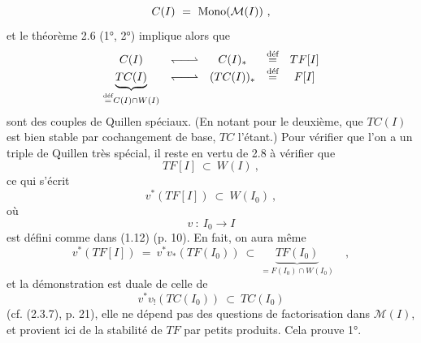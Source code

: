 \[ C(I) \ = \ \Mono(\mathcal{M}(I))\ , \]
et le théorème 2.6 (1°, 2°) implique alors que
\[ \begin{array}{ccccc}
C(I) & \qpair & C(I)_* & \deq & TF[I]\\
\underbrace{TC(I)}_{\deq C(I)\cap W(I)} & \qpair & (TC(I))_* & \deq & F[I]
\end{array} \] %
sont des couples de Quillen spéciaux. (En notant pour le deuxième, que $TC(I)$ est bien  stable par cochangement de base, $TC$ l'étant.) Pour vérifier que l'on a un triple de Quillen très spécial, il reste en vertu de 2.8 à vérifier que
\[ TF[I] \ \subset\ W(I)\ , \]
ce qui s'écrit
\[ v^*(TF[I]) \ \subset\ W(I_0)\ , \]
où
\[ v \ :\ I_0 \longrightarrow I \]
est défini comme dans (1.12) (p. 10). En fait, on aura même
\[ v^*(TF[I]) \ = \ v^*v_*(TF(I_0)) \ \subset\ \underbrace{TF(I_0)}_{= F(I_0)\cap W(I_0)}\quad , \]
et la démonstration est duale de celle de
\[ v^*v_!(TC(I_0)) \ \subset\ TC(I_0) \]
(cf. (2.3.7), p. 21), elle ne dépend pas des questions de factorisation dans $\mathcal{M}(I)$, et provient ici de la stabilité de $TF$ par petits produits. Cela prouve 1°.

